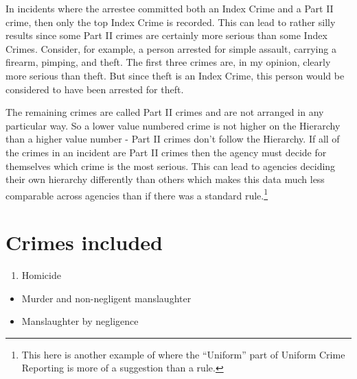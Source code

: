 \documentclass[
]{krantz}
\providecommand{\tightlist}{%
  \setlength{\itemsep}{0pt}\setlength{\parskip}{0pt}}
\begin{document}
In incidents where the arrestee committed both an Index
Crime and a Part II crime, then only the top Index Crime is
recorded. This can lead to rather silly results since some
Part II crimes are certainly more serious than some Index
Crimes. Consider, for example, a person arrested for simple
assault, carrying a firearm, pimping, and theft. The first
three crimes are, in my opinion, clearly more serious than
theft. But since theft is an Index Crime, this person would
be considered to have been arrested for theft.

The remaining crimes are called Part II crimes and are not
arranged in any particular way. So a lower value numbered
crime is not higher on the Hierarchy than a higher value
number - Part II crimes don't follow the Hierarchy. If all
of the crimes in an incident are Part II crimes then the
agency must decide for themselves which crime is the most
serious. This can lead to agencies deciding their own
hierarchy differently than others which makes this data much
less comparable across agencies than if there was a standard
rule.\footnote{This here is another example of where the
  ``Uniform'' part of Uniform Crime Reporting is more of a
  suggestion than a rule.}

\section{Crimes included}\label{arrestsCrimesIncluded}

\begin{enumerate}
\def\labelenumi{\arabic{enumi}.}
\tightlist
\item
  Homicide
\end{enumerate}

\begin{itemize}
\tightlist
\item
  Murder and non-negligent manslaughter
\item
  Manslaughter by negligence
\end{itemize}
\end{document}
